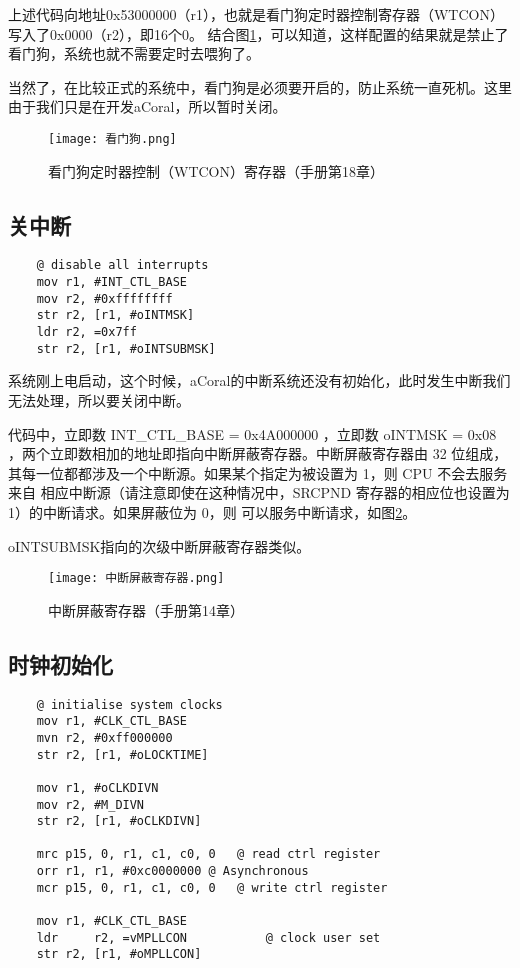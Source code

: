 上述代码向地址0x53000000（r1），也就是看门狗定时器控制寄存器（WTCON）写入了0x0000（r2），即16个0。
结合图\ref{看门狗}，可以知道，这样配置的结果就是禁止了看门狗，系统也就不需要定时去喂狗了。

当然了，在比较正式的系统中，看门狗是必须要开启的，防止系统一直死机。这里由于我们只是在开发aCoral，所以暂时关闭。


\begin{figure}[H]
	\texttt{[image: 看门狗.png]}
	\caption{看门狗定时器控制（WTCON）寄存器（手册第18章）}
	\label{看门狗}
\end{figure}
\subsection{关中断}
\begin{lstlisting}
	@ disable all interrupts
	mov	r1, #INT_CTL_BASE
	mov	r2, #0xffffffff
	str	r2, [r1, #oINTMSK]
	ldr	r2, =0x7ff
	str	r2, [r1, #oINTSUBMSK]
\end{lstlisting}

系统刚上电启动，这个时候，aCoral的中断系统还没有初始化，此时发生中断我们无法处理，所以要关闭中断。

代码中，立即数 INT\_CTL\_BASE = 0x4A000000 ，立即数 oINTMSK = 0x08 ，两个立即数相加的地址即指向中断屏蔽寄存器。中断屏蔽寄存器由 32 位组成，其每一位都都涉及一个中断源。如果某个指定为被设置为 1，则 CPU 不会去服务来自
相应中断源（请注意即使在这种情况中，SRCPND 寄存器的相应位也设置为 1）的中断请求。如果屏蔽位为 0，则
可以服务中断请求，如图\ref{中断屏蔽寄存器}。

oINTSUBMSK指向的次级中断屏蔽寄存器类似。

\begin{figure}[H]
	\texttt{[image: 中断屏蔽寄存器.png]}
	\caption{中断屏蔽寄存器（手册第14章）}
	\label{中断屏蔽寄存器}
\end{figure}


\subsection{时钟初始化}
\begin{lstlisting}
	@ initialise system clocks
	mov	r1, #CLK_CTL_BASE
	mvn	r2, #0xff000000
	str	r2, [r1, #oLOCKTIME]

	mov	r1, #oCLKDIVN
	mov	r2, #M_DIVN
	str	r2, [r1, #oCLKDIVN]

	mrc	p15, 0, r1, c1, c0, 0	@ read ctrl register
	orr	r1, r1, #0xc0000000	@ Asynchronous
	mcr	p15, 0, r1, c1, c0, 0	@ write ctrl register

	mov	r1, #CLK_CTL_BASE
	ldr 	r2, =vMPLLCON	        @ clock user set
	str	r2, [r1, #oMPLLCON]
\end{lstlisting}

